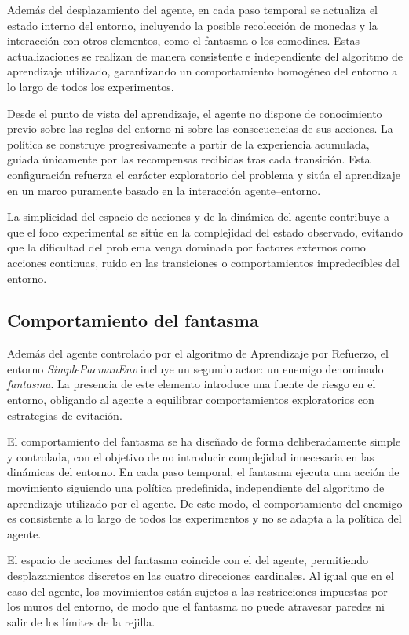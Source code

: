 Además del desplazamiento del agente, en cada paso temporal se actualiza el estado interno del entorno, incluyendo la posible recolección de monedas y la interacción con otros elementos, como el fantasma o los comodines. Estas actualizaciones se realizan de manera consistente e independiente del algoritmo de aprendizaje utilizado, garantizando un comportamiento homogéneo del entorno a lo largo de todos los experimentos.

Desde el punto de vista del aprendizaje, el agente no dispone de conocimiento previo sobre las reglas del entorno ni sobre las consecuencias de sus acciones. La política se construye progresivamente a partir de la experiencia acumulada, guiada únicamente por las recompensas recibidas tras cada transición. Esta configuración refuerza el carácter exploratorio del problema y sitúa el aprendizaje en un marco puramente basado en la interacción agente–entorno.

La simplicidad del espacio de acciones y de la dinámica del agente contribuye a que el foco experimental se sitúe en la complejidad del estado observado, evitando que la dificultad del problema venga dominada por factores externos como acciones continuas, ruido en las transiciones o comportamientos impredecibles del entorno.

\subsection{Comportamiento del fantasma}

Además del agente controlado por el algoritmo de Aprendizaje por Refuerzo, el entorno \textit{SimplePacmanEnv} incluye un segundo actor: un enemigo denominado \textit{fantasma}. La presencia de este elemento introduce una fuente de riesgo en el entorno, obligando al agente a equilibrar comportamientos exploratorios con estrategias de evitación.

El comportamiento del fantasma se ha diseñado de forma deliberadamente simple y controlada, con el objetivo de no introducir complejidad innecesaria en las dinámicas del entorno. En cada paso temporal, el fantasma ejecuta una acción de movimiento siguiendo una política predefinida, independiente del algoritmo de aprendizaje utilizado por el agente. De este modo, el comportamiento del enemigo es consistente a lo largo de todos los experimentos y no se adapta a la política del agente.

El espacio de acciones del fantasma coincide con el del agente, permitiendo desplazamientos discretos en las cuatro direcciones cardinales. Al igual que en el caso del agente, los movimientos están sujetos a las restricciones impuestas por los muros del entorno, de modo que el fantasma no puede atravesar paredes ni salir de los límites de la rejilla.

